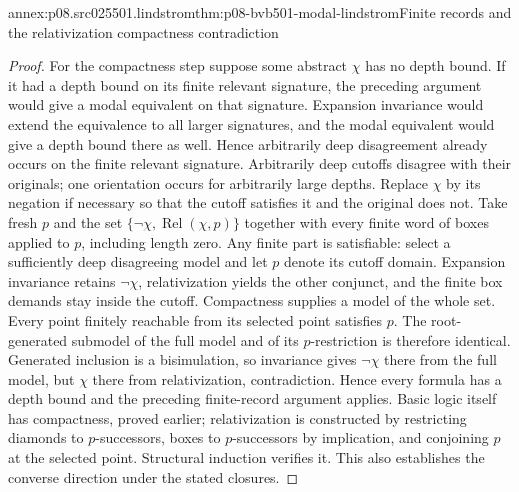 \begin{annexitem}{annex:p08.src025501.lindstrom}{thm:p08-bvb501-modal-lindstrom}{Finite records and the relativization compactness contradiction}
\begin{proof}
For the compactness step suppose some abstract \(\chi\) has no
depth bound. If it had a depth bound on its finite relevant signature,
the preceding argument would give a modal equivalent on that signature.
Expansion invariance would extend the equivalence to all larger
signatures, and the modal equivalent would give a depth bound there
as well. Hence arbitrarily deep disagreement already occurs on the
finite relevant signature. Arbitrarily deep cutoffs disagree with their originals;
one orientation occurs for arbitrarily large depths. Replace \(\chi\)
by its negation if necessary so that the cutoff satisfies it and the
original does not. Take fresh \(p\) and the set
\(\{\neg\chi,\operatorname{Rel}(\chi,p)\}\) together with
every finite word of boxes applied to \(p\), including length zero.
Any finite part is satisfiable: select a sufficiently deep disagreeing
model and let \(p\) denote its cutoff domain. Expansion invariance
retains \(\neg\chi\), relativization yields the other conjunct,
and the finite box demands stay inside the cutoff. Compactness supplies
a model of the whole set. Every point finitely reachable from its
selected point satisfies \(p\). The root-generated submodel of
the full model and of its \(p\)-restriction is therefore identical.
Generated inclusion is a bisimulation, so invariance gives
\(\neg\chi\) there from the full model, but \(\chi\)
there from relativization, contradiction. Hence every formula has a
depth bound and the preceding finite-record argument applies.
Basic logic itself has compactness, proved earlier; relativization is
constructed by restricting diamonds to \(p\)-successors, boxes
to \(p\)-successors by implication, and conjoining \(p\) at
the selected point. Structural induction verifies it. This also
establishes the converse direction under the stated closures.
\end{proof}
\end{annexitem}

